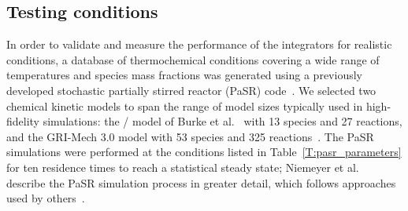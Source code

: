 \documentclass[preprint]{elsarticle}
\begin{document}
\subsection{Testing conditions}
\label{S:pasr_conditions}

In order to validate and measure the performance of the integrators for realistic conditions, a database of thermochemical conditions covering a wide range of temperatures and species mass fractions was generated using a previously developed stochastic partially stirred reactor (PaSR) code~\cite{Niemeyer:2015ws}.
We selected two chemical kinetic models to span the range of model sizes typically used in high-fidelity simulations: the \slash{} model of Burke et al.~\cite{Burke:2011fh} with 13 species and 27 reactions, and the GRI-Mech 3.0 model with 53 species and 325 reactions~\cite{smith_gri-mech_30}.
The PaSR simulations were performed at the conditions listed in Table~\ref{T:pasr_parameters} for ten residence times to reach a statistical steady state; Niemeyer et al.~\cite{Niemeyer:2015ws} describe the PaSR simulation process in greater detail, which follows approaches used by others~\cite{Chen:1997ta,Pope:1997wu,Ren:2004fz,Ren:2014cd}.
%
\end{document}
